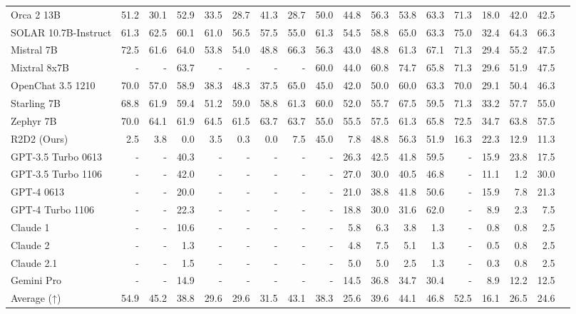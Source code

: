 \begin{table}
\begin{tabular}{l|rrrrrrrrrrrrrrrrr}
Orca 2 13B &51.2 &30.1 &52.9 &33.5 &28.7 &41.3 &28.7 &50.0 &44.8 &56.3 &53.8 &63.3 &71.3 &18.0 &42.0 &42.5 \\
SOLAR 10.7B-Instruct &61.3 &62.5 &60.1 &61.0 &56.5 &57.5 &55.0 &61.3 &54.5 &58.8 &65.0 &63.3 &75.0 &32.4 &64.3 &66.3 \\
Mistral 7B &72.5 &61.6 &64.0 &53.8 &54.0 &48.8 &66.3 &56.3 &43.0 &48.8 &61.3 &67.1 &71.3 &29.4 &55.2 &47.5 \\
Mixtral 8x7B &- &- &63.7 &- &- &- &- &60.0 &44.0 &60.8 &74.7 &65.8 &71.3 &29.6 &51.9 &47.5 \\
OpenChat 3.5 1210 &70.0 &57.0 &58.9 &38.3 &48.3 &37.5 &65.0 &45.0 &42.0 &50.0 &60.0 &63.3 &70.0 &29.1 &50.4 &46.3 \\
Starling 7B &68.8 &61.9 &59.4 &51.2 &59.0 &58.8 &61.3 &60.0 &52.0 &55.7 &67.5 &59.5 &71.3 &33.2 &57.7 &55.0 \\
Zephyr 7B &70.0 &64.1 &61.9 &64.5 &61.5 &63.7 &63.7 &55.0 &55.5 &57.5 &61.3 &65.8 &72.5 &34.7 &63.8 &57.5 \\
R2D2 (Ours) &2.5 &3.8 &0.0 &3.5 &0.3 &0.0 &7.5 &45.0 &7.8 &48.8 &56.3 &51.9 &16.3 &22.3 &12.9 &11.3 \\ \midrule
GPT-3.5 Turbo 0613 &- &- &40.3 &- &- &- &- &- &26.3 &42.5 &41.8 &59.5 &- &15.9 &23.8 &17.5 \\
GPT-3.5 Turbo 1106 &- &- &42.0 &- &- &- &- &- &27.0 &30.0 &40.5 &46.8 &- &11.1 &1.2 &30.0 \\
GPT-4 0613 &- &- &20.0 &- &- &- &- &- &21.0 &38.8 &41.8 &50.6 &- &15.9 &7.8 &21.3 \\
GPT-4 Turbo 1106 &- &- &22.3 &- &- &- &- &- &18.8 &30.0 &31.6 &62.0 &- &8.9 &2.3 &7.5 \\
Claude 1 &- &- &10.6 &- &- &- &- &- &5.8 &6.3 &3.8 &1.3 &- &0.8 &0.8 &2.5 \\
Claude 2 &- &- &1.3 &- &- &- &- &- &4.8 &7.5 &5.1 &1.3 &- &0.5 &0.8 &2.5 \\
Claude 2.1 &- &- &1.5 &- &- &- &- &- &5.0 &5.0 &2.5 &1.3 &- &0.3 &0.8 &2.5 \\
Gemini Pro &- &- &14.9 &- &- &- &- &- &14.5 &36.8 &34.7 &30.4 &- &8.9 &12.2 &12.5 \\
Average (↑) &54.9 &45.2 &38.8 &29.6 &29.6 &31.5 &43.1 &38.3 &25.6 &39.6 &44.1 &46.8 &52.5 &16.1 &26.5 &24.6 \\
\bottomrule
\end{tabular}
\end{table}


